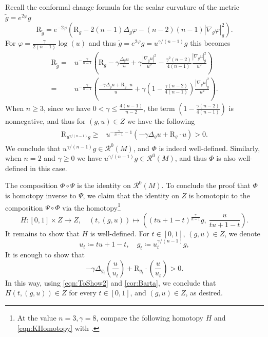 \documentclass[11pt]{amsart}
\numberwithin{equation}{section}
\newcommand{\Riem}{\mathcal{R}}
\newcommand{\scal}{\mathrm{R}}
\newcommand{\Laplace}{\Delta}
\let\ge\geqslant
\let\geq\geqslant
\let\le\leqslant
\begin{document}
Recall the conformal change formula for the scalar curvature of the metric $\tilde g = e^{2\varphi}g$
\begin{equation}\label{eq:conformal-change-scalar-curvature}
  \scal_{\tilde g} = e^{-2\varphi}\left(\scal_g-2(n-1)\Delta_g\varphi-(n-2)(n-1)|\nabla_g \varphi|_g^2\right).
\end{equation}
For $\varphi = \tfrac{\gamma}{2(n-1)}\log(u)$ and thus $\tilde g = e^{2\varphi}g = u^{\gamma/(n-1)}g$ this becomes
\begin{align*}
  \scal_{\tilde g} ={}& u^{-\frac{\gamma}{n-1}}\left(\scal_g-\gamma\frac{\Laplace_g u}{u} + \gamma\frac{|\nabla_gu|^2}{u^2} -\frac{\gamma^2(n-2)}{4(n-1)}\frac{|\nabla_g u|_g^2}{u^2}\right)\\
    ={}&u^{-\frac{\gamma}{n-1}}\left(\frac{-\gamma\Laplace_gu + \scal_g\cdot u}{u} + \gamma\left(1-\frac{\gamma(n-2)}{4(n-1)}\right)\frac{|\nabla_g u|_g^2}{u^2}\right).
\end{align*}
When $n\geq 3$, since we have $0< \gamma\le\frac{4(n-1)}{n-2}$, the term $\left(1-\tfrac{\gamma(n-2)}{4(n-1)}\right)$ is nonnegative, and thus for $(g,u)\in Z$ we have the following
\begin{align*}
  \begin{split}
    \scal_{u^{\gamma/(n-1)}g} \ge{}& u^{-\frac{\gamma}{n-1}-1}(-\gamma\Delta_g u + \scal_g\cdot u) >0.
  \end{split}
\end{align*}  
We conclude that  $u^{\gamma/(n-1)}g\in \Riem^0(M)$, and $\Phi$ is indeed well-defined. Similarly, when $n=2$ and $\gamma\geq 0$ we have $u^{\gamma/(n-1)}g\in\Riem^0(M)$, and thus $\Phi$ is also well-defined in this case.

The composition $\Phi\circ\Psi$ is the identity on $\Riem^0(M)$.
To conclude the proof that $\Phi$ is homotopy inverse to $\Psi$, we claim that the identity on $Z$ is homotopic to the composition $\Psi\circ\Phi$ via the  homotopy\footnote{At the value $n=3,\gamma=8$, compare the following homotopy $H$ and \eqref{eqn:KHomotopy} with
\cite[Proof of Theorem 1.4]{LiMantoulidis2023}.}
\[H\colon [0,1]\times Z\to Z,\quad (t,(g,u))\mapsto \left((tu+1-t)^{\frac{\gamma}{n-1}}g,\ \frac{u}{tu+1-t}\right).
\]
It remains to show that $H$ is well-defined. For $t \in [0,1]$, $(g,u)\in Z$, we denote
\begin{equation}\label{eqn:ToShow}
   u_t \coloneqq  tu+1-t, \quad g_t \coloneqq  u_t^{\gamma/(n-1)}g,
\end{equation}
It is enough to show that
\begin{equation}\label{eqn:ToShow2}
-\gamma\Delta_{g_t}\left(\frac{u}{u_t}\right) + \scal_{g_t}\cdot \left(\frac{u}{u_t}\right)>0. 
\end{equation}
In this way, using \eqref{eqn:ToShow2} and \cref{cor:Barta}, we conclude that $H(t,(g,u))\in Z$ for every $t\in[0,1]$, and $(g,u)\in Z$, as desired.
\end{document}
